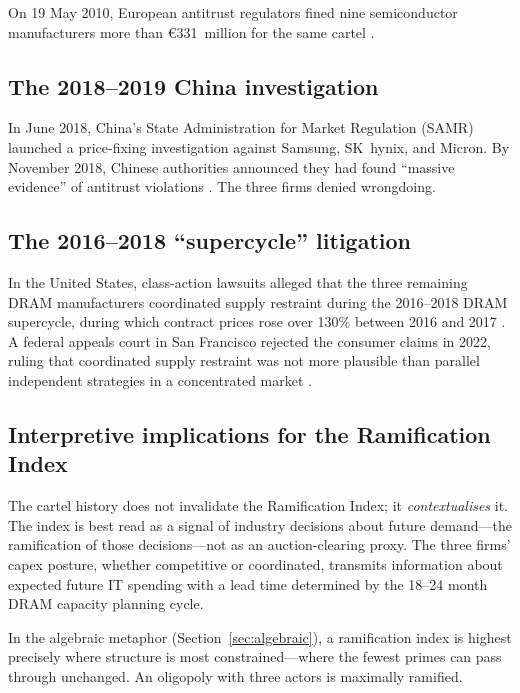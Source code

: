 \documentclass[12pt]{article}
\theoremstyle{definition}
\begin{document}
On 19 May 2010, European antitrust regulators fined nine semiconductor manufacturers more than \euro331~million for the same cartel \cite{DRAMWiki}.

\subsection{The 2018--2019 China investigation}

In June 2018, China's State Administration for Market Regulation (SAMR) launched a price-fixing investigation against Samsung, SK~hynix, and Micron. By November 2018, Chinese authorities announced they had found ``massive evidence'' of antitrust violations \cite{PYMNTS2018}. The three firms denied wrongdoing.

\subsection{The 2016--2018 ``supercycle'' litigation}

In the United States, class-action lawsuits alleged that the three remaining DRAM manufacturers coordinated supply restraint during the 2016--2018 DRAM supercycle, during which contract prices rose over 130\% between 2016 and 2017 \cite{AppleInsider2021}. A federal appeals court in San Francisco rejected the consumer claims in 2022, ruling that coordinated supply restraint was not more plausible than parallel independent strategies in a concentrated market \cite{Bloomberg2022}.

\subsection{Interpretive implications for the Ramification Index}

The cartel history does not invalidate the Ramification Index; it \emph{contextualises} it. The index is best read as a signal of industry decisions about future demand---the ramification of those decisions---not as an auction-clearing proxy. The three firms' capex posture, whether competitive or coordinated, transmits information about expected future IT spending with a lead time determined by the 18--24 month DRAM capacity planning cycle.

In the algebraic metaphor (Section~\ref{sec:algebraic}), a ramification index is highest precisely where structure is most constrained---where the fewest primes can pass through unchanged. An oligopoly with three actors is maximally ramified.
\end{document}
